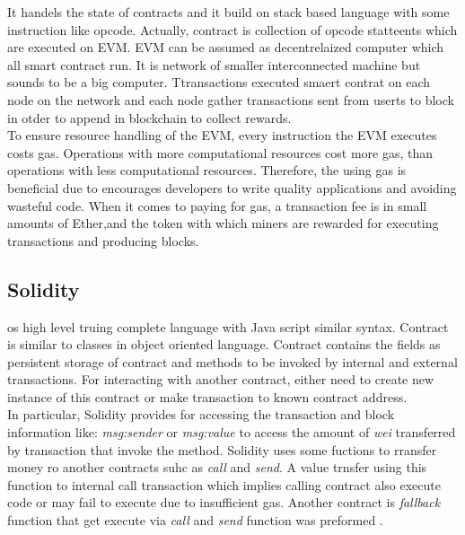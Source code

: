 It handels the state of contracts and it build on stack based language with some instruction like opcode. Actually, contract is collection of opcode statteents which are executed on EVM.  EVM can be assumed as decentrelaized computer which all smart contract run. It is network of smaller interconnected machine but sounds to be a big computer. Ttransactions executed smaert contrat on each node on the network and each node gather transactions sent from userts to block in otder to append in blockchain to collect rewards.\\
 To ensure resource  handling  of the EVM,  every instruction  the EVM executes costs gas. Operations with more computational resources cost more gas, than operations with less computational resources. Therefore, the using gas is beneficial due to encourages developers to write quality applications and avoiding wasteful code. When it comes to paying for gas, a transaction fee is in small amounts of Ether,and the token with which miners are rewarded for executing transactions and producing blocks\cite{Zdun}. 
 \subsection{Solidity} os high level truing complete language with Java script similar syntax. Contract is similar to classes in object oriented language. Contract contains the fields as persistent storage of contract and methods to be invoked by internal and external transactions. For interacting with another contract, either need to create new instance of this contract or make transaction to known contract address.\\
In particular, Solidity provides for accessing the transaction and block information like: \textit{msg:sender} or \textit{msg:value} to access the amount of \textit{wei} transferred by transaction that invoke the method. Solidity uses some fuctions to rransfer money ro another contracts suhc as \textit{call} and \textit{send}. A value trnsfer using this function to internal call transaction which implies calling contract also execute code or may fail to execute due to insufficient gas. Another contract is \textit{fallback} function that get execute via \textit{call} and \textit{send} function was preformed \cite{Ilya}.

